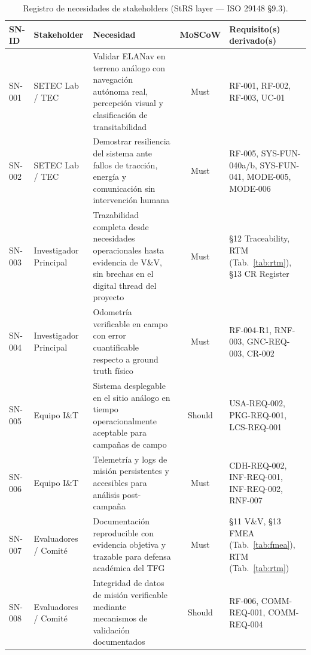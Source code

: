 \begin{table}[H]
\centering
\scriptsize
\begin{tabularx}{\textwidth}{| l | l | X | c | p{3.8cm} |}
\hline
\textbf{SN-ID} & \textbf{Stakeholder} & \textbf{Necesidad} & \textbf{MoSCoW} & \textbf{Requisito(s) derivado(s)} \\ \hline

SN-001 & SETEC Lab / TEC &
Validar ELANav en terreno análogo con navegación autónoma real, percepción visual y clasificación de transitabilidad &
Must &
RF-001, RF-002, RF-003, UC-01 \\ \hline

SN-002 & SETEC Lab / TEC &
Demostrar resiliencia del sistema ante fallos de tracción, energía y comunicación sin intervención humana &
Must &
RF-005, SYS-FUN-040a/b, SYS-FUN-041, MODE-005, MODE-006 \\ \hline

SN-003 & Investigador Principal &
Trazabilidad completa desde necesidades operacionales hasta evidencia de V\&V, sin brechas en el digital thread del proyecto &
Must &
§12 Traceability, RTM (Tab.~\ref{tab:rtm}), §13 CR Register \\ \hline

SN-004 & Investigador Principal &
Odometría verificable en campo con error cuantificable respecto a ground truth físico &
Must &
RF-004-R1, RNF-003, GNC-REQ-003, CR-002 \\ \hline

SN-005 & Equipo I\&T &
Sistema desplegable en el sitio análogo en tiempo operacionalmente aceptable para campañas de campo &
Should &
USA-REQ-002, PKG-REQ-001, LCS-REQ-001 \\ \hline

SN-006 & Equipo I\&T &
Telemetría y logs de misión persistentes y accesibles para análisis post-campaña &
Must &
CDH-REQ-002, INF-REQ-001, INF-REQ-002, RNF-007 \\ \hline

SN-007 & Evaluadores / Comité &
Documentación reproducible con evidencia objetiva y trazable para defensa académica del TFG &
Must &
§11 V\&V, §13 FMEA (Tab.~\ref{tab:fmea}), RTM (Tab.~\ref{tab:rtm}) \\ \hline

SN-008 & Evaluadores / Comité &
Integridad de datos de misión verificable mediante mecanismos de validación documentados &
Should &
RF-006, COMM-REQ-001, COMM-REQ-004 \\ \hline

\end{tabularx}
\caption{Registro de necesidades de stakeholders (StRS layer — ISO 29148 §9.3).}
\label{tab:sn_register}
\end{table}

